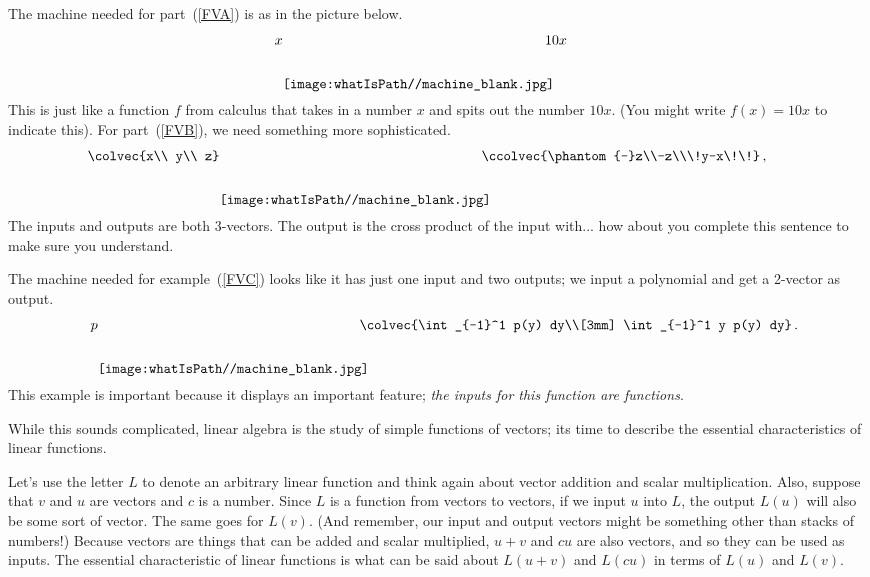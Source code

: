 The machine needed for part~(\ref{FVA}) is as in the picture below. 
\[x \raisebox{-11mm}{\texttt{[image: \\whatIsPath//machine\_blank.jpg]} }\! \! \!\! \! \!10 x\, \hspace{8mm}\]
This is just like a function $f$ from calculus that takes in a number $x$ and spits out the number $10x$. (You might write $f(x)=10x$ to indicate this).
For part~(\ref{FVB}), we need something more sophisticated. 
\[\!\!\!\!\!\!\!\!\!\colvec{x\\ y\\ z} \raisebox{-11mm}{\texttt{[image: \\whatIsPath//machine\_blank.jpg]} }\! \! \!\! \! \!\ccolvec{\phantom{-}z\\-z\\\!y-x\!\!}\, ,\]
The inputs and outputs are both 3-vectors. The output is the cross product of the input with... how about you complete this sentence to make sure you understand.

The machine needed for example~(\ref{FVC}) looks like it has just one input and two outputs; we input a polynomial and get a 2-vector as output.
\[\quad p \raisebox{-11mm}{\texttt{[image: \\whatIsPath//machine\_blank.jpg]} }\! \! \!\! \! \!\colvec{\int_{-1}^1  p(y) dy\\[3mm]
\int_{-1}^1 y p(y) dy}\, .\]
This example is important because it displays an important feature; 
{\itshape the inputs for this function are functions}.

While this sounds complicated, %
linear algebra is the
study of %
simple %
functions of vectors; its time to describe the essential characteristics of linear functions. 

Let's use the letter $L$ to denote an arbitrary linear function and think again about vector addition and scalar multiplication. 
Also,  suppose that $v$ and $u$ are vectors and $c$ is a number. 
Since $L$ is a function from vectors to vectors, if we input $u$ into $L$, the output $L(u)$ will also be some sort of vector. 
The same goes for 
$L(v)$.
(And remember, our input and output vectors might be something other than stacks of numbers!) 
Because vectors are things that can be added and scalar multiplied, 
$u+v$ and $cu$ are also vectors, and so they can be used as inputs.
The essential characteristic of linear functions is what can be said about 
$L(u+v)$ and $L(cu)$ in terms of 
$L(u)$ and $L(v)$. 

